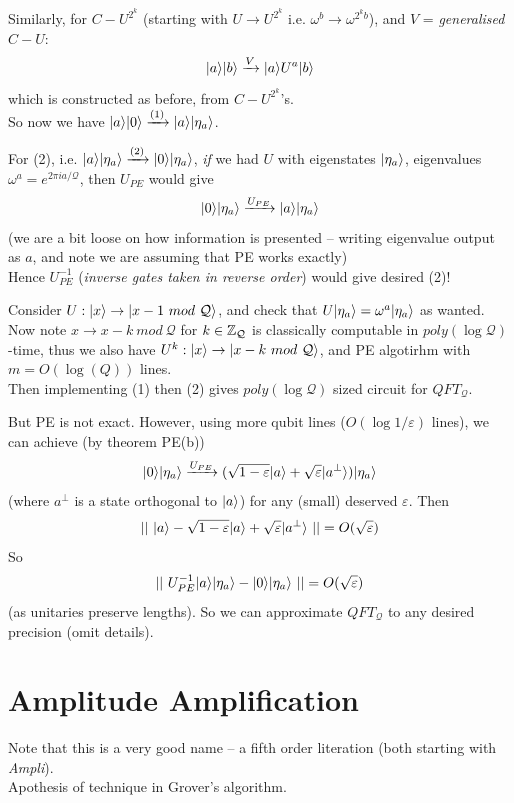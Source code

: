 \documentclass[a4paper]{article}
\begin{document}
Similarly, for $C-U^{2^k}$ (starting with $U \to U^{2^k}$ i.e. $\omega^b \to \omega^{2^kb}$), and $V$ = \emph{generalised $C-U$}: 
$$|a\rangle |b\rangle \xrightarrow{V} |a\rangle U^a |b\rangle$$
which is constructed as before, from $C-U^{2^k}$'s.\\
So now we have $|a\rangle |0\rangle \xrightarrow{(1)} |a\rangle |\eta_a\rangle$.

For (2), i.e. $|a\rangle |\eta_a\rangle \xrightarrow{(2)} |0\rangle |\eta_a\rangle$, \emph{if} we had $U$ with eigenstates $|\eta_a\rangle$, eigenvalues $\omega^a = e^{2\pi i a/\mathcal{Q}}$, then $U_{PE}$ would give
$$|0\rangle |\eta_a\rangle \xrightarrow{U_{PE}} |a\rangle |\eta_a\rangle$$
(we are a bit loose on how information is presented -- writing eigenvalue output as $a$, and note we are assuming that PE works exactly)\\
Hence $U^{-1}_{PE}$ (\emph{inverse gates taken in reverse order}) would give desired (2)!

Consider $U:|x\ket \to |x-1\ mod\ \mathcal{Q}\ket$, and check that $U |\eta_a\rangle = \omega^a |\eta_a\rangle$ as wanted.\\
Now note $x \to x-k\ mod\ \mathcal{Q}$ for $k \in \mathbb{Z}_{\mathcal{Q}}$ is classically computable in $poly(\log\mathcal{Q})$-time, thus we also have $U^k: |x\ket \to |x-k\ mod\ \mathcal{Q}\ket$, and PE algotirhm with $m=O(\log(Q))$ lines.\\
Then implementing (1) then (2) gives $poly(\log\mathcal{Q})$ sized circuit for $QFT_{\mathcal{Q}}$.

But PE is not exact. However, using more qubit lines ($O(\log 1/\varepsilon)$ lines), we can achieve (by theorem PE(b))
$$|0\rangle |\eta_a \rangle \xrightarrow{U_{PE}} (\sqrt{1-\varepsilon} |a\rangle + \sqrt{\varepsilon} |a^\perp \rangle) |\eta_a\rangle$$
(where $a^\perp$ is a state orthogonal to $|a\rangle$) for any (small) deserved $\varepsilon$. Then
$$||\ |a\rangle - \sqrt{1-\varepsilon} |a\rangle + \sqrt{\varepsilon} | a^\perp \rangle\ || = O(\sqrt{\varepsilon})$$
So
$$||\ U_{PE}^{-1} |a\ket |\eta_a\ket - |0\ket |\eta_a\ket\ || = O(\sqrt{\varepsilon})$$
(as unitaries preserve lengths). So we can approximate $QFT_{\mathcal{Q}}$ to any desired precision (omit details).

\newpage

\section{Amplitude Amplification}
Note that this is a very good name -- a fifth order literation (both starting with \emph{Ampli}).\\
Apothesis of technique in Grover's algorithm.
\end{document}
